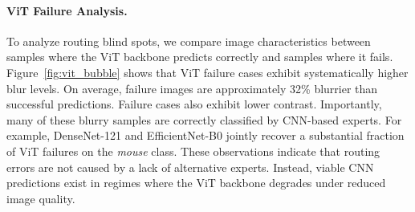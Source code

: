 \paragraph{ViT Failure Analysis.}
To analyze routing blind spots, we compare image characteristics between samples where the ViT backbone predicts correctly and samples where it fails.
Figure~\ref{fig:vit_bubble} shows that ViT failure cases exhibit systematically higher blur levels.
On average, failure images are approximately 32\% blurrier than successful predictions.
Failure cases also exhibit lower contrast.
Importantly, many of these blurry samples are correctly classified by CNN-based experts.
For example, DenseNet-121 and EfficientNet-B0 jointly recover a substantial fraction of ViT failures on the \textit{mouse} class.
These observations indicate that routing errors are not caused by a lack of alternative experts.
Instead, viable CNN predictions exist in regimes where the ViT backbone degrades under reduced image quality.
